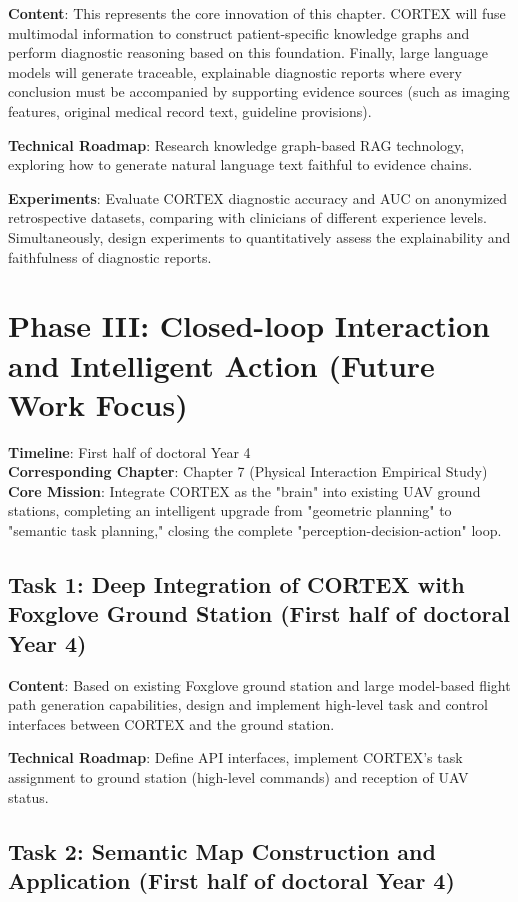 \textbf{Content}: This represents the core innovation of this chapter. CORTEX will fuse multimodal information to construct patient-specific knowledge graphs and perform diagnostic reasoning based on this foundation. Finally, large language models will generate traceable, explainable diagnostic reports where every conclusion must be accompanied by supporting evidence sources (such as imaging features, original medical record text, guideline provisions).

\textbf{Technical Roadmap}: Research knowledge graph-based RAG technology, exploring how to generate natural language text faithful to evidence chains.

\textbf{Experiments}: Evaluate CORTEX diagnostic accuracy and AUC on anonymized retrospective datasets, comparing with clinicians of different experience levels. Simultaneously, design experiments to quantitatively assess the explainability and faithfulness of diagnostic reports.

\section{Phase III: Closed-loop Interaction and Intelligent Action (Future Work Focus)}

\textbf{Timeline}: First half of doctoral Year 4\\
\textbf{Corresponding Chapter}: Chapter 7 (Physical Interaction Empirical Study)\\
\textbf{Core Mission}: Integrate CORTEX as the "brain" into existing UAV ground stations, completing an intelligent upgrade from "geometric planning" to "semantic task planning," closing the complete "perception-decision-action" loop.

\subsection{Task 1: Deep Integration of CORTEX with Foxglove Ground Station (First half of doctoral Year 4)}

\textbf{Content}: Based on existing Foxglove ground station and large model-based flight path generation capabilities, design and implement high-level task and control interfaces between CORTEX and the ground station.

\textbf{Technical Roadmap}: Define API interfaces, implement CORTEX's task assignment to ground station (high-level commands) and reception of UAV status.

\subsection{Task 2: Semantic Map Construction and Application (First half of doctoral Year 4)}

